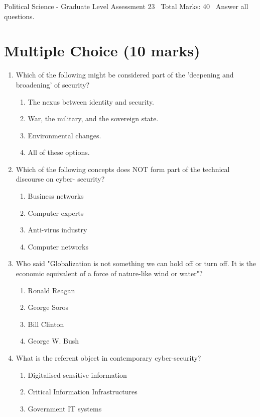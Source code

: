 \documentclass[12pt]{article}
\begin{document}
\begin{center}
Political Science - Graduate Level Assessment 23 \
Total Marks: 40 \
Answer all questions.
\end{center}

\section*{Multiple Choice (10 marks)}
\begin{enumerate}[label=\arabic*.]
\item Which of the following might be considered part of the 'deepening and broadening' of security?
\begin{enumerate}[label=(\alph*)]
    \item The nexus between identity and security.
    \item War, the military, and the sovereign state.
    \item Environmental changes.
    \item All of these options.
\end{enumerate}
\item Which of the following concepts does NOT form part of the technical discourse on cyber- security?
\begin{enumerate}[label=(\alph*)]
    \item Business networks
    \item Computer experts
    \item Anti-virus industry
    \item Computer networks
\end{enumerate}
\item Who said "Globalization is not something we can hold off or turn off. It is the economic equivalent of a force of nature-like wind or water"?
\begin{enumerate}[label=(\alph*)]
    \item Ronald Reagan
    \item George Soros
    \item Bill Clinton
    \item George W. Bush
\end{enumerate}
\item What is the referent object in contemporary cyber-security?
\begin{enumerate}[label=(\alph*)]
    \item Digitalised sensitive information
    \item Critical Information Infrastructures
    \item Government IT systems

\end{enumerate}
\end{enumerate}
\end{document}
